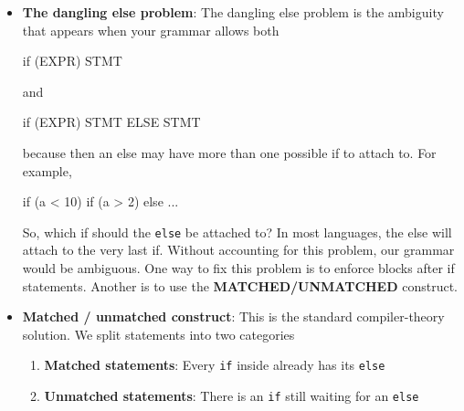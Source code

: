 \documentclass{report}
\begin{document}
\begin{itemize}
\begin{align*}
                E &\to F < F \mid F \leq F \mid F > F \mid F \geq F \mid F \\
                F &\to F + G \mid F - G \mid G\\
                G &\to G * H \mid G / H \mid G \text{ mod } H \mid H\\
                H &\to \neg I \mid \oplus I \mid I\\
                I &\to I \land J \mid J\\
                J &\to (A) \mid \text{int} \mid \text{ true } \mid \text{ false } \mid \text{ ident }
            .\end{align*}
            Note that a statement block is itself a statement.
        \item \textbf{The dangling else problem}: The dangling else problem is the ambiguity that appears when your grammar allows both
            \bigbreak \noindent 
            \begin{cppcode}
            if (EXPR) STMT
            \end{cppcode}
            \bigbreak \noindent 
            and
            \bigbreak \noindent 
            \begin{cppcode}
            if (EXPR) STMT ELSE STMT
            \end{cppcode}
            \bigbreak \noindent 
            because then an else may have more than one possible if to attach to. For example, 
            \bigbreak \noindent 
            \begin{cppcode}
                if (a < 10) 
                    if (a > 2)
                else
                    ...
            \end{cppcode}
            \bigbreak \noindent 
            So, which if should the \texttt{else} be attached to? In most languages, the else will attach to the very last if. Without accounting for this problem, our grammar would be ambiguous. 
            \bigbreak \noindent 
            One way to fix this problem is to enforce blocks after if statements. Another is to use the \textbf{MATCHED/UNMATCHED} construct.
        \item \textbf{Matched / unmatched construct}: This is the standard compiler-theory solution. We split statements into two categories
            \begin{enumerate}
                \item \textbf{Matched statements}: Every \texttt{if} inside already has its \texttt{else}
                \item \textbf{Unmatched statements}: There is an \texttt{if} still waiting for an \texttt{else}

\end{enumerate}
\end{itemize}
\end{document}
